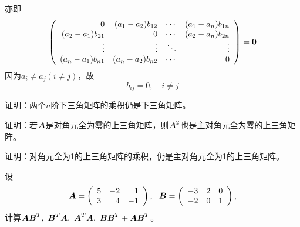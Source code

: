 \begin{frame}
  \begin{footnotesize}
    亦即
    $$
    \left(
    \begin{array}{rrrr}
      0&(a_1-a_2)b_{12}&\cdots&(a_1-a_n)b_{1n}\\
      (a_2-a_1)b_{21}&0&\cdots&(a_2-a_n)b_{2n}\\
      \vdots&\vdots&\ddots&\vdots\\
      (a_n-a_1)b_{n1}&(a_n-a_2)b_{n2}&\cdots&0
    \end{array}
    \right)=\boldsymbol{0}
    $$
    因为$a_i\ne a_j(i\ne j)$，故
    $$
    b_{ij}=0, \quad i\ne j
    $$
  \end{footnotesize}
\end{frame}

\begin{frame}
  \begin{footnotesize}
    \begin{li}{30}
      证明：两个$n$阶下三角矩阵的乘积仍是下三角矩阵。
    \end{li}
  \end{footnotesize}
\end{frame}



\begin{frame}
  \begin{footnotesize}
    \begin{li}{31}
      证明：若$\boldsymbol{A}$是对角元全为零的上三角矩阵，则$\boldsymbol{A}^2$也是主对角元全为零的上三角矩阵。
    \end{li}
  \end{footnotesize}
\end{frame}



\begin{frame}
  \begin{footnotesize}
    \begin{li}{32}
      证明：对角元全为1的上三角矩阵的乘积，仍是主对角元全为1的上三角矩阵。
    \end{li}
  \end{footnotesize}
\end{frame}


\begin{frame}
  \begin{footnotesize}
    \begin{li}{33}
      设$$\boldsymbol{A}=\left(
      \begin{array}{rrr}
        5&-2&1\\
        3&4&-1
      \end{array}
      \right),~~\boldsymbol{B}=\left(
      \begin{array}{rrr}
        -3&2&0\\
        -2&0&1
      \end{array}
      \right),$$
      计算$\boldsymbol{A}\boldsymbol{B}^T,~\boldsymbol{B}^T\boldsymbol{A},~\boldsymbol{A}^T\boldsymbol{A},~\boldsymbol{B}\boldsymbol{B}^T+\boldsymbol{A}\boldsymbol{B}^T$。
    \end{li}
  \end{footnotesize}
\end{frame}



